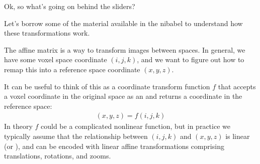 \documentclass[letterpaper,10pt,english]{sphinxmanual}
\begin{document}

Ok, so what’s going on behind the sliders?

Let’s borrow some of the material available in the nibabel  to understand how these transformations work.

The affine matrix is a way to transform images between spaces. In general, we have some voxel space coordinate \((i, j, k)\), and we want to figure out how to remap this into a reference space coordinate \((x, y, z)\).

It can be useful to think of this as a coordinate transform function \(f\) that accepts a voxel coordinate in the original space as an  and returns a coordinate in the  reference space:
\begin{equation*}
\begin{split}(x, y, z) = f(i, j, k)\end{split}
\end{equation*}
In theory \(f\) could be a complicated non\sphinxhyphen{}linear function, but in practice we typically assume that the relationship between \((i, j, k)\) and \((x, y, z)\) is linear (or ), and can be encoded with linear affine transformations comprising translations, rotations, and zooms.
\end{document}
